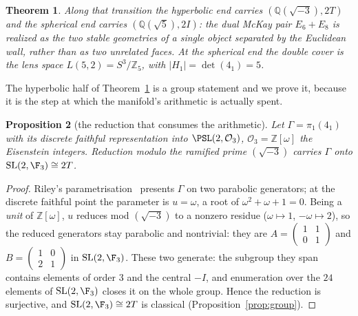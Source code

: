 \documentclass[11pt,reqno]{amsart}
\theoremstyle{plain}
\newtheorem{theorem}{Theorem}[section]
\newtheorem{proposition}[theorem]{Proposition}
\theoremstyle{definition}
\theoremstyle{remark}
\newcommand{\Q}{\mathbb{Q}}
\newcommand{\Z}{\mathbb{Z}}
\newcommand{\SL}{\mathrm{SL}}
\begin{document}
\begin{theorem}\label{thm:ends}
Along that transition the hyperbolic end carries $(\Q(\sqrt{-3}),2T)$ and the spherical
end carries $(\Q(\sqrt5),2I)$: the dual McKay pair $E_6+E_8$ is realized as the two
stable geometries of a single object separated by the Euclidean wall, rather than as two
unrelated faces. At the spherical end the double cover is the lens space
$L(5,2)=S^3/\Z_5$, with $|H_1|=\det(4_1)=5$.
\end{theorem}

The hyperbolic half of Theorem~\ref{thm:ends} is a group statement and we prove it,
because it is the step at which the manifold's arithmetic is actually spent.

\begin{proposition}[the reduction that consumes the arithmetic]\label{prop:mod3}
Let $\Gamma=\pi_1(4_1)$ with its discrete faithful representation into
$\PSL(2,\mathcal{O}_3)$, $\mathcal{O}_3=\Z[\omega]$ the Eisenstein integers. Reduction
modulo the ramified prime $(\sqrt{-3})$ carries $\Gamma$ \emph{onto}
$\SL(2,\F_3)\cong 2T$.
\end{proposition}

\begin{proof}
Riley's parametrisation~\cite{Riley} presents $\Gamma$ on two parabolic generators; at
the discrete faithful point the parameter is $u=\omega$, a root of $\omega^2+\omega+1=0$.
Being a \emph{unit} of $\Z[\omega]$, $u$ reduces mod $(\sqrt{-3})$ to a nonzero residue
($\omega\mapsto1$, $-\omega\mapsto2$), so the reduced generators stay parabolic and
nontrivial: they are $A=\left(\begin{smallmatrix}1&1\\0&1\end{smallmatrix}\right)$ and
$B=\left(\begin{smallmatrix}1&0\\2&1\end{smallmatrix}\right)$ in $\SL(2,\F_3)$. These two
generate: the subgroup they span contains elements of order $3$ and the central $-I$, and
enumeration over the $24$ elements of $\SL(2,\F_3)$ closes it on the whole group. Hence
the reduction is surjective, and $\SL(2,\F_3)\cong2T$ is classical
(Proposition~\ref{prop:group}).
\end{proof}
\end{document}
